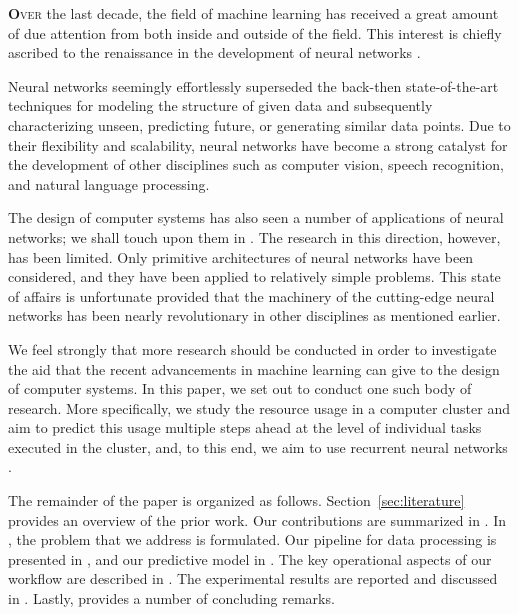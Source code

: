 \lettrine[findent=0.4em, nindent=0em]{\textbf{O}}{ver} the last decade, the
field of machine learning has received a great amount of due attention from both
inside and outside of the field. This interest is chiefly ascribed to the
renaissance in the development of neural networks \cite{goodfellow2016}.

Neural networks seemingly effortlessly superseded the back-then state-of-the-art
techniques for modeling the structure of given data and subsequently
characterizing unseen, predicting future, or generating similar data points. Due
to their flexibility and scalability, neural networks have become a strong
catalyst for the development of other disciplines such as computer vision,
speech recognition, and natural language processing.

The design of computer systems has also seen a number of applications of neural
networks; we shall touch upon them in . The research in this
direction, however, has been limited. Only primitive architectures of neural
networks have been considered, and they have been applied to relatively simple
problems. This state of affairs is unfortunate provided that the machinery of
the cutting-edge neural networks has been nearly revolutionary in other
disciplines as mentioned earlier.

We feel strongly that more research should be conducted in order to investigate
the aid that the recent advancements in machine learning can give to the design
of computer systems. In this paper, we set out to conduct one such body of
research. More specifically, we study the resource usage in a computer cluster
and aim to predict this usage multiple steps ahead at the level of individual
tasks executed in the cluster, and, to this end, we aim to use recurrent neural
networks \cite{goodfellow2016}.

The remainder of the paper is organized as follows. Section~\ref{sec:literature}
provides an overview of the prior work. Our contributions are summarized in
. In , the problem that we address is
formulated. Our pipeline for data processing is presented in , and
our predictive model in . The key operational aspects of our
workflow are described in . The experimental results are
reported and discussed in . Lastly,  provides a
number of concluding remarks.
